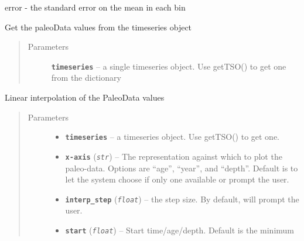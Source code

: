 \documentclass[letterpaper,10pt,english]{sphinxmanual}
\begin{document}
\begin{fulllineitems}
\begin{fulllineitems}
\begin{description}
error - the standard error on the mean in each bin

\end{description}

\end{fulllineitems}


\begin{fulllineitems}
\label{Basic:pyleoclim.Basic.getValues}
Get the paleoData values from the timeseries object
\begin{quote}\begin{description}
\item[{Parameters}] \leavevmode
\textbf{\texttt{timeseries}} -- a single timeseries object. Use getTSO() to get
one from the dictionary

\end{description}\end{quote}

\end{fulllineitems}


\begin{fulllineitems}
\label{Basic:pyleoclim.Basic.interp_Ts}
Linear interpolation of the PaleoData values
\begin{quote}\begin{description}
\item[{Parameters}] \leavevmode\begin{itemize}
\item {} 
\textbf{\texttt{timeseries}} -- a timeseries object. Use getTSO() to get one.

\item {} 
\textbf{\texttt{x-axis}} (\emph{\texttt{str}}) -- The representation against which to plot the
paleo-data. Options are ``age'', ``year'', and ``depth''.
Default is to let the system choose if only one available
or prompt the user.

\item {} 
\textbf{\texttt{interp\_step}} (\emph{\texttt{float}}) -- the step size. By default, will prompt the user.

\item {} 
\textbf{\texttt{start}} (\emph{\texttt{float}}) -- Start time/age/depth. Default is the minimum


\end{itemize}
\end{description}
\end{quote}
\end{fulllineitems}
\end{fulllineitems}
\end{document}
